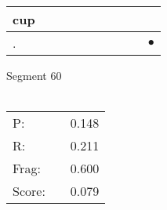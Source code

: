 \documentclass[landscape]{article}
\newcommand{\ssp}{\hspace{2pt}}
\newcommand{\mex}{\cellcolor{g}$\bullet$}
\begin{document}
\begin{tabular}{|l|p{10pt}|p{10pt}|p{10pt}|p{10pt}|p{10pt}|p{10pt}|p{10pt}|p{10pt}|p{10pt}|}
\hline
\ssp cup \ssp&\hspace{2pt}&\hspace{2pt}&\hspace{2pt}&\hspace{2pt}&\hspace{2pt}&\hspace{2pt}&\hspace{2pt}&\hspace{2pt}&\hspace{2pt}\\
\hline
\ssp \cellcolor{ref8}. \ssp&\hspace{2pt}&\hspace{2pt}&\hspace{2pt}&\hspace{2pt}&\hspace{2pt}&\hspace{2pt}&\hspace{2pt}&\hspace{2pt}&\hspace{2pt}\mex\\
\hline
\end{tabular}

\vspace{6pt}
\noindent Segment 60\\\\
\noindent\begin{tabular}{lm{12pt}r}
\hline
P:&&0.148\\
R:&&0.211\\
Frag:&&0.600\\
Score:&&0.079\\
\end{tabular}

\newpage
\end{document}
